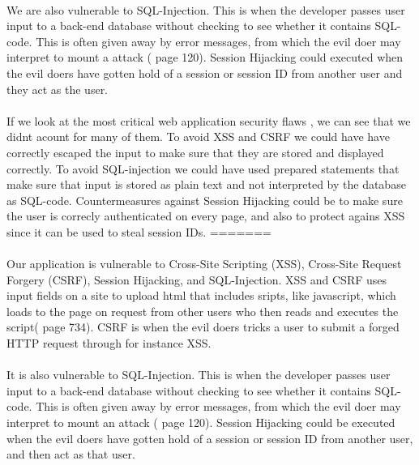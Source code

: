 \documentclass[a4paper,11pt]{article}
\begin{document}
\paragraph{}We are also vulnerable to SQL-Injection. This is when the developer passes user input to a back-end database without checking to see whether it contains SQL-code. This is often given away by error messages, from which the evil doer may interpret to mount a attack (\cite{8} page 120). Session Hijacking could executed when the evil doers have gotten hold of a session or session ID from another user and they act as the user.
\paragraph{}If we look at the most critical web application security flaws \cite{7}, we can see that we didnt acount for many of them. To avoid XSS and CSRF we could have have correctly escaped the input to make sure that they are stored and displayed correctly. To avoid SQL-injection we could have used prepared statements that make sure that input is stored as plain text and not interpreted by the database as SQL-code. Countermeasures against Session Hijacking could be to make sure the user is correcly authenticated on every page, and also to protect agains XSS since it can be used to steal session IDs.
=======
\paragraph{}Our application is vulnerable to Cross-Site Scripting (XSS), Cross-Site Request Forgery (CSRF), Session Hijacking, and SQL-Injection. XSS and CSRF uses input fields on a site to upload html that includes sripts, like javascript, which loads to the page on request from other users who then reads and executes the script(\cite{8} page 734). CSRF is when the evil doers tricks a user to submit a forged HTTP request through for instance XSS.
\paragraph{}It is also vulnerable to SQL-Injection. This is when the developer passes user input to a back-end database without checking to see whether it contains SQL-code. This is often given away by error messages, from which the evil doer may interpret to mount an attack (\cite{8} page 120). Session Hijacking could be executed when the evil doers have gotten hold of a session or session ID from another user, and then act as that user.
\end{document}
